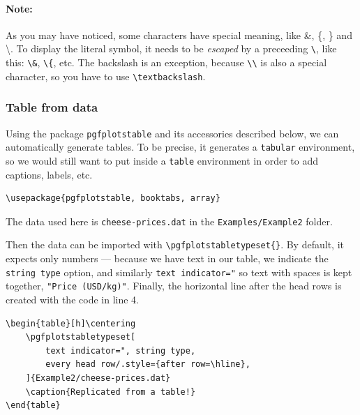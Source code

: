 \paragraph{Note:} As you may have noticed, some characters have special meaning, like \&, \{, \} and \textbackslash. To display the literal symbol, it needs to be \emph{escaped} by a preceeding \verb|\|, like this: \verb|\&|, \verb|\{|, etc. The backslash is an exception, because \verb|\\| is also a special character, so you have to use \verb|\textbackslash|.

\subsubsection{Table from data}
Using the package \texttt{pgfplotstable} and its accessories described below, we can automatically generate tables.
To be precise, it generates a \texttt{tabular} environment, so we would still want to put inside a \texttt{table} environment in order to add captions, labels, etc.
  
\begin{lstlisting}
\usepackage{pgfplotstable, booktabs, array}
\end{lstlisting}

The data used here is \texttt{cheese-prices.dat} in the \texttt{Examples/Example2} folder.


Then the data can be imported with \verb|\pgfplotstabletypeset{}|.
By default, it expects only numbers --- because we have text in our table, we indicate the \texttt{string type} option, and similarly \verb|text indicator="| so text with spaces is kept together, \verb|"Price (USD/kg)"|. 
Finally, the horizontal line after the head rows is created with the code in line 4.
\begin{lstlisting}
\begin{table}[h]\centering
    \pgfplotstabletypeset[
        text indicator=", string type,
        every head row/.style={after row=\hline},
    ]{Example2/cheese-prices.dat}
    \caption{Replicated from a table!}
\end{table}     
\end{lstlisting}

\begin{table}[h]\centering
    \caption{Replicated from a table!}
\end{table}

